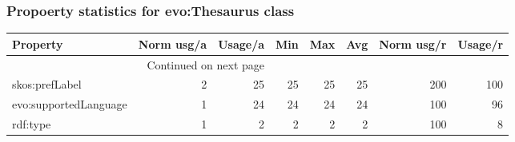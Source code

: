 \documentclass[10pt,a4paper,titlepage,final]{article}
\begin{document}
\subsubsection{Propoerty statistics for evo:Thesaurus class}
\begin{longtable}{lrrrrrrr}
\toprule
              Property &  Norm usg/a &  Usage/a &  Min &  Max &  Avg &  Norm usg/r &  Usage/r \\
\midrule
\endhead
\midrule
\multicolumn{3}{r}{{Continued on next page}} \\
\midrule
\endfoot

\bottomrule
\endlastfoot
        skos:prefLabel &           2 &       25 &   25 &   25 &   25 &         200 &      100 \\
 evo:supportedLanguage &           1 &       24 &   24 &   24 &   24 &         100 &       96 \\
              rdf:type &           1 &        2 &    2 &    2 &    2 &         100 &        8 \\
\end{longtable}
\end{document}
